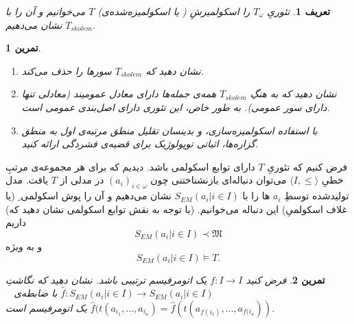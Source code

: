 \documentclass[12pt,a4paper]{report}
\theoremstyle{colorhead}
\newtheorem{tam}{تمرین}
\newtheorem{defn}[thm]{تعریف}
\begin{document}
\begin{defn}
تئوریِ
$T_\omega$
را
اسکولمیزشِ ( یا اسکولمیزه‌شده‌ی)
$T$
می‌خوانیم و آن را با
$T_{skolem}$
نشان می‌دهیم.
\end{defn}
\begin{tam}
\hfill
\begin{enumerate}
\item 
نشان دهید که 
$T_{skolem}$
سورها را حذف می‌کند.
\item
نشان دهید که به هنگِ
$T_{skolem}$
همه‌ی جمله‌ها دارای معادل عمومیند (معادلی تنها دارای سور عمومی). به طور خاص، این تئوری دارای 
 اصل‌بندی عمومی است.
\item 
با استفاده اسکولمیزه‌سازی، و بدینسان تقلیل منطق مرتبه‌ی اول به منطق گزاره‌ها، اثباتی توپولوژیک برای قضیه‌ی فشردگی ارائه کنید.
\end{enumerate}
\end{tam}
فرض کنیم که تئوریِ
$T$
دارای توابع اسکولمی باشد. دیدیم که برای هر مجموعه‌ی مرتبِ خطیِ
$\langle I,\leq\rangle$
می‌توان دنباله‌ای بازنشناختنی چون
$(a_i)_{i\in \omega}$
در مدلی از
$T$
یافت. مدل تولیدشده‌ توسطِ
$a_i$
ها را با 
$S_{EM}(a_i|i\in I)$
نشان می‌دهیم و آن را پوش اسکولمی ِ
(یا غلاف اسکولمیِ)
این دنباله می‌خوانیم. (با توجه به نقش توابع اسکولمی نشان دهید که) داریم
\[
S_{EM}(a_i|i\in I)\prec \mathfrak{M}
\]
و به ويژه
\[
S_{EM}(a_i|i\in I)\models T.
\]
\begin{tam}
فرض کنید
$f:I\to I$
یک اتومرفیسم ترتیبی باشد. نشان دهید که نگاشتِ
$\hat{f}:S_{EM}(a_i|i\in I)\to S_{EM}(a_i|i\in I)$
با ضابطه‌ی
\mbox{
$\hat{f}(t(a_{i_1},\ldots,a_{i_n})=
\hat{f}(t(a_{f(i_1)},\ldots,a_{f(i_n}))$}
یک اتومرفیسم است. 
\end{tam}
\newpage 
\end{document}
